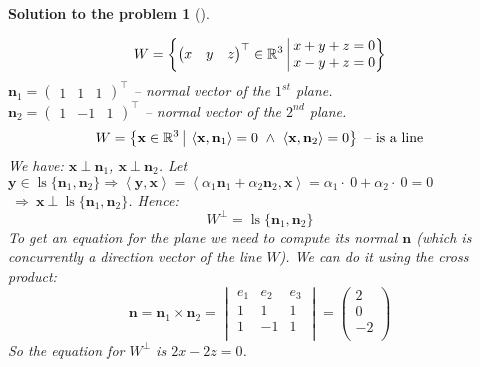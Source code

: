 \documentclass[12pt,a4]{article}
\newtheorem{solution}{Solution to the problem}
\newcommand\ls{\operatorname{ls}}
\newcommand{\bn}{{\mathbf n}}
\newcommand{\bx}{{\mathbf x}}
\newcommand{\by}{{\mathbf y}}
\newcommand{\sprod}[2]{\left \langle #1, #2 \right \rangle}
\begin{document}
\begin{solution}[]
\begin{enumerate}[(a)]
\[
W = \left\{\begin{pmatrix} x & y & z \end{pmatrix}^\top \in \mathbb{R}^3
~\vline~
\begin{matrix}
x+y+z=0 \\
x-y+z=0 \\
\end{matrix}
\right\}
\]
$\bn_1 = \begin{pmatrix} 1 & 1 & 1 \end{pmatrix}^\top$ -- normal vector of the $1^{st}$ plane.\\
$\bn_2 = \begin{pmatrix} 1 & -1 & 1 \end{pmatrix}^\top$ -- normal vector of the $2^{nd}$ plane.
\[
W = \left\{\bx \in \mathbb{R}^3
~\vline~
\sprod{\bx}{\bn_1}=0 ~\wedge~
\sprod{\bx}{\bn_2}=0 
\right\} \text{ -- is a line}
\]
We have: $\bx ~\bot~ \bn_1 $, $ \bx ~\bot~ \bn_2$. Let $\by \in \ls\{\bn_1, \bn_2\} \Rightarrow \sprod{\by}{\bx}=\sprod{\alpha_1\bn_1 + \alpha_2\bn_2}{\bx} = \alpha_1 \cdot~ 0 + \alpha_2 \cdot~ 0 = 0$ 
$~\Rightarrow~ \bx ~\bot~ \ls\{\bn_1, \bn_2\}$.
Hence:
\[
W^\perp = \ls\{\bn_1, \bn_2\}
\]
To get an equation for the plane we need to compute its normal $\bn$ (which is concurrently a direction vector of the line $W$). We can do it using the cross product:
\[
\bn = \bn_1 \times \bn_2 = 
\begin{vmatrix}
e_1 & e_2 & e_3 \\
1 & 1 & 1 \\
1 & -1 & 1 \\
\end{vmatrix}
=
\begin{pmatrix}
2 \\
0 \\
-2 \\
\end{pmatrix}
\]
So the equation for $W^\perp$ is $2x -2z = 0$.\\
\end{enumerate}
\end{solution}
\end{document}
